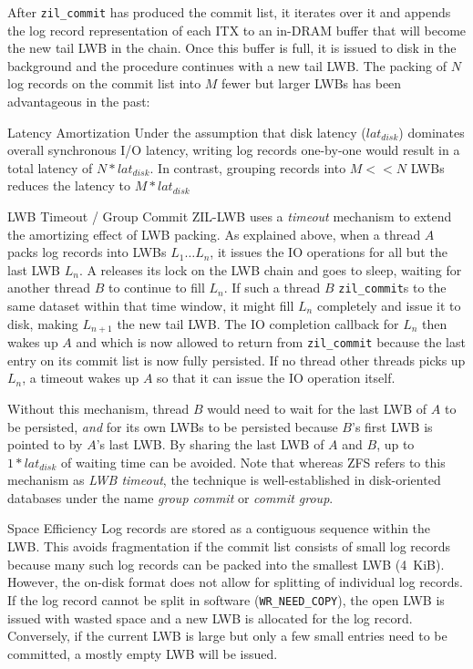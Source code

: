 \documentclass[12pt,a4paper,twoside]{book}
\begin{document}
After \lstinline{zil_commit} has produced the commit list, it iterates over it and appends the log record representation of each ITX to an in-DRAM buffer that will become the new tail LWB in the chain.
Once this buffer is full, it is issued to disk in the background and the procedure continues with a new tail LWB.
The packing of $N$ log records on the commit list into $M$ fewer but larger LWBs has been advantageous in the past:
\begin{description}[noitemsep]
    \item[Latency Amortization]
        Under the assumption that disk latency ($lat_{disk}$) dominates overall synchronous I/O latency, writing log records one-by-one would result in a total latency of $N * lat_{disk}$.
        In contrast, grouping records into $M << N$ LWBs reduces the latency to $M * lat_{disk}$
    \item[LWB Timeout / Group Commit]
        ZIL-LWB uses a \textit{timeout} mechanism to extend the amortizing effect of LWB packing.
        As explained above, when a thread $A$ packs log records into LWBs $L_1 \dots L_n$, it issues the IO operations for all but the last LWB $L_n$.
        A releases its lock on the LWB chain and goes to sleep, waiting for another thread $B$ to continue to fill $L_n$.
        If such a thread $B$ \lstinline{zil_commit}s to the same dataset within that time window, it might fill $L_n$ completely and issue it to disk, making $L_{n+1}$ the new tail LWB.
        The IO completion callback for $L_n$ then wakes up $A$ and which is now allowed to return from \lstinline{zil_commit} because the last entry on its commit list is now fully persisted.
        If no thread other threads picks up $L_n$, a timeout wakes up $A$ so that it can issue the IO operation itself.

        Without this mechanism, thread $B$ would need to wait for the last LWB of $A$ to be persisted, \textit{and} for its own LWBs to be persisted because $B$'s first LWB is pointed to by $A$'s last LWB.
        By sharing the last LWB of $A$ and $B$, up to $1 * lat_{disk}$ of waiting time can be avoided.
        Note that whereas ZFS refers to this mechanism as \textit{LWB timeout}, the technique is well-established in disk-oriented databases under the name \textit{group commit} or \textit{commit group}.

    \item[Space Efficiency]
        Log records are stored as a contiguous sequence within the LWB.
        This avoids fragmentation if the commit list consists of small log records because many such log records can be packed into the smallest LWB (4~KiB).
        However, the on-disk format does not allow for splitting of individual log records.
        If the log record cannot be split in software (\lstinline{WR_NEED_COPY}), the open LWB is issued with wasted space and a new LWB is allocated for the log record.
        Conversely, if the current LWB is large but only a few small entries need to be committed, a mostly empty LWB will be issued.
\end{description}
\end{document}
